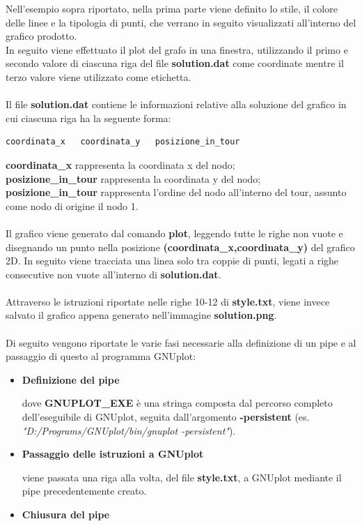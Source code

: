 Nell'esempio sopra riportato, nella prima parte viene definito lo stile, il colore delle linee e la tipologia di punti, che verrano in seguito visualizzati all'interno del grafico prodotto.\\In seguito viene effettuato il plot del grafo in una finestra, utilizzando il primo e secondo valore di ciascuna riga del file \textbf{solution.dat} come coordinate mentre il terzo valore viene utilizzato come etichetta.\\\\
Il file \textbf{solution.dat} contiene le informazioni relative alla soluzione del grafico in cui ciascuna riga ha la seguente forma:
\begin{lstlisting}[linewidth=290pt,basicstyle=\footnotesize\sffamily,]     
coordinata_x   coordinata_y   posizione_in_tour
\end{lstlisting}
\textbf{coordinata\_x} rappresenta la coordinata x del nodo;\\
\textbf{posizione\_in\_tour} rappresenta la coordinata y del nodo;\\
\textbf{posizione\_in\_tour} rappresenta l'ordine del nodo all'interno del tour, assunto come nodo di origine il nodo 1.\\\\
Il grafico viene generato dal comando \textbf{plot}, leggendo tutte le righe non vuote e disegnando un punto nella posizione \textbf{(coordinata\_x,coordinata\_y)} del grafico 2D. In seguito viene tracciata una linea solo tra coppie di punti, legati a righe consecutive non vuote all'interno di \textbf{solution.dat}.\\\\
Attraverso le istruzioni riportate nelle righe 10-12 di \textbf{style.txt}, viene invece salvato il grafico appena generato nell'immagine \textbf{solution.png}.\\\\
Di seguito vengono riportate le varie fasi necessarie alla definizione di un pipe e al passaggio di questo al programma GNUplot:
\begin{itemize}
\item{\textbf{Definizione del pipe}

dove \textbf{GNUPLOT\_EXE} è una stringa composta dal percorso completo dell'eseguibile di GNUplot, seguita dall'argomento \textbf{-persistent} (es. \textit{"D:/Programs/GNUplot/bin/gnuplot -persistent"}).
}
\item{\textbf{Passaggio delle istruzioni a GNUplot}

viene passata una riga alla volta, del file \textbf{style.txt}, a GNUplot mediante il pipe precedentemente creato.
}
\item{\textbf{Chiusura del pipe}

}
\end{itemize}

